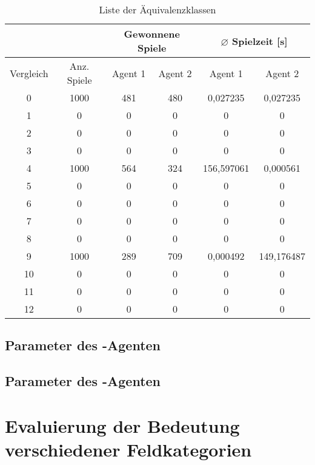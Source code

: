 \begin{table}[ht]
\begin{center}
\begin{tabular}{| c | c | c | c | c | c |} \hline
 &  & \multicolumn{2}{|c|}{Gewonnene Spiele} & \multicolumn{2}{|c|}{$\varnothing$ Spielzeit [s]} \\ \hline
Vergleich & Anz. Spiele & Agent 1 & Agent 2 & Agent 1 & Agent 2 \\ \hline
\hline
0 & 1000 & 481 & 480 & 0,027235 & 0,027235  \\ \hline
1 & 0 & 0 & 0 & 0& 0 \\ \hline
2 & 0 & 0 & 0 & 0& 0  \\ \hline
3 & 0 & 0 & 0 & 0 & 0 \\ \hline
4 & 1000 & 564 & 324 & 156,597061 & 0,000561 \\ \hline
5 & 0 & 0 & 0 & 0 & 0\\ \hline
6 & 0 & 0 & 0 & 0 & 0\\ \hline
7 & 0 & 0 & 0 & 0 & 0\\ \hline
8 & 0 & 0 & 0 & 0& 0 \\ \hline
9 & 1000 & 289 & 709 & 0,000492 & 149,176487 \\ \hline
10 & 0 & 0 & 0 & 0 & 0\\ \hline
11 & 0 & 0 & 0 & 0 & 0\\ \hline
12 & 0 & 0 & 0 & 0 & 0\\ \hline
\end{tabular}
\end{center}
\caption{Liste der Äquivalenzklassen}
\label{tbl:cmp-results}
\end{table}

\subsection*{Parameter des -Agenten}
\label{eval:agents:params:subsec-mc}

\subsection*{Parameter des -Agenten}
\label{eval:agents:params:subsec-ab}


\section{Evaluierung der Bedeutung verschiedener Feldkategorien}


